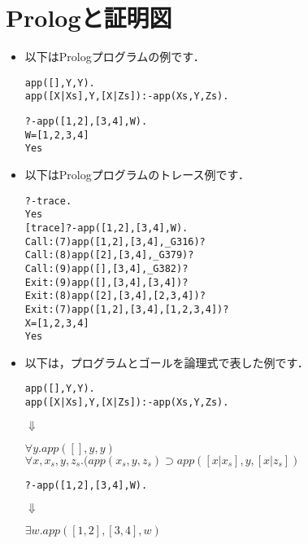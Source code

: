 \documentclass[a4j]{jarticle}
\newcommand{\imp}{\supset}
\begin{document}
\section{Prologと証明図 }

\begin{itemize}
\item 以下はPrologプログラムの例です．
\begin{alltt}
  % プログラム
  app([], Y, Y).
  app([X|Xs], Y, [X|Zs]) :- app(Xs, Y, Zs).

  % ゴール
  ?- app([1,2], [3,4], W).
  W = [1, 2, 3, 4] 
  Yes
\end{alltt}

\item 以下はPrologプログラムのトレース例です．
\begin{alltt}
  ?- trace.
  Yes
  [trace]  ?- app([1,2], [3,4], W).
     {\color{red}Call: (7)} app([1, 2], [3, 4], _G316) ? 
     {\color{green}Call: (8)} app([2], [3, 4], _G379) ? 
     {\color{blue}Call: (9)} app([], [3, 4], _G382) ? 
     {\color{blue}Exit: (9)} app([], [3, 4], [3, 4]) ? 
     {\color{green}Exit: (8)} app([2], [3, 4], [2, 3, 4]) ? 
     {\color{red}Exit: (7)} app([1, 2], [3, 4], [1, 2, 3, 4]) ? 
  X = [1, 2, 3, 4] 
  Yes
\end{alltt}

\item 以下は，プログラムとゴールを論理式で表した例です．
\begin{alltt}
% プログラム
app([], Y, Y).
app([X|Xs], Y, [X|Zs]) :- app(Xs, Y, Zs).
\end{alltt}
\qquad\qquad $\Downarrow$
\begin{flushleft}{\color{red}
\(\forall y.app([], y, y) \) \\
\(\forall x,x_s,y,z_s.(app(x_s,y,z_s)\imp app([x|x_s],y,[x|z_s]) \) }
\end{flushleft}

\begin{alltt}
% ゴール
?- app([1,2], [3,4], W).
\end{alltt}
\qquad\qquad$\Downarrow$
\begin{flushleft}{\color{red}
\(\exists w.app([1,2],[3,4],w)\)} 
\end{flushleft}
\end{itemize}
\end{document}
